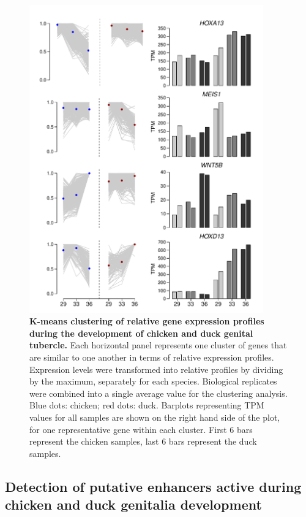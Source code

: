 \begin{figure}[hbt!]
 \centering
 \includegraphics[width=0.9\textwidth, page=1] {figures/IPLOSS/IPLOSS_Figure3.pdf}
 \caption[K-means clustering of relative expression profiles (clusters with similar behavior between chicken and duck)]{
 \textbf{K-means clustering of relative gene expression profiles during the development of chicken and duck genital tubercle.}
 Each horizontal panel represents one cluster of genes that are similar to one another in terms of relative expression profiles. Expression levels were transformed into relative profiles by dividing by the maximum, separately for each species. Biological replicates were combined into a single average value for the clustering analysis. Blue dots: chicken; red dots: duck. Barplots representing TPM values for all samples are shown on the right hand side of the plot, for one representative gene within each cluster. First 6 bars represent the chicken samples, last 6 bars represent the duck samples.
 \\
 }
 \label{fig:IPLOSS-fig3}
\end{figure} 

\subsection{Detection of putative enhancers active during chicken and duck genitalia development}

